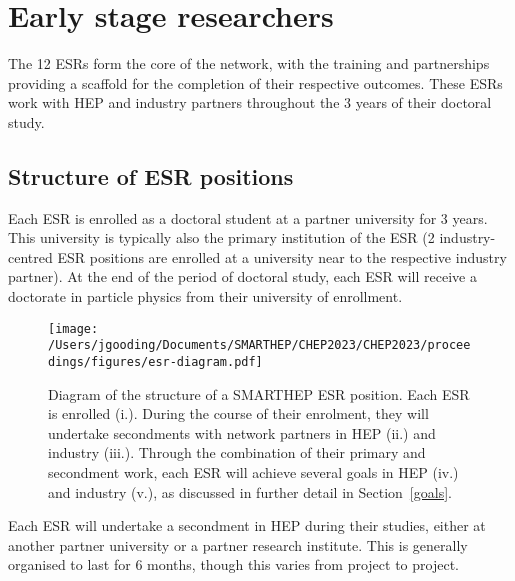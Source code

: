 \section{Early stage researchers}
\label{esrs}
The 12 ESRs form the core of the network, with the training and partnerships providing a scaffold for the completion of their respective outcomes. These ESRs work with HEP and industry partners throughout the 3 years of their doctoral study.%

\subsection{Structure of ESR positions}
\label{esr-structure}
Each ESR is enrolled as a doctoral student at a partner university for 3 years. This university is typically also the primary institution of the ESR (2 industry-centred ESR positions are enrolled at a university near to the respective industry partner). At the end of the period of doctoral study, each ESR will receive a doctorate in particle physics from their university of enrollment.\par
\begin{figure*}[h!]
    \centering
    \texttt{[image: /Users/jgooding/Documents/SMARTHEP/CHEP2023/CHEP2023/proceedings/figures/esr-diagram.pdf]}
    \caption{Diagram of the structure of a SMARTHEP ESR position. Each ESR is enrolled (i.). During the course of their enrolment, they will undertake secondments with network partners in HEP (ii.) and industry (iii.). Through the combination of their primary and secondment work, each ESR will achieve several goals in HEP (iv.) and industry (v.), as discussed in further detail in Section~\ref{goals}.}
    \label{esr-diagram}       %
\end{figure*}

Each ESR will undertake a secondment in HEP during their studies, either at another partner university or a partner research institute. This is generally organised to last for 6 months, though this varies from project to project.\par

